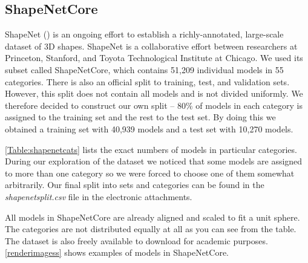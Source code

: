 


\subsection{ShapeNetCore}
\label{sec:shapenetcore}
ShapeNet (\cite{chang_shapenet:_2015}) is an ongoing effort to establish a richly-annotated, large-scale dataset of 3D shapes. ShapeNet is a collaborative effort between researchers at Princeton, Stanford, and Toyota Technological Institute at Chicago. We used its subset called ShapeNetCore, which contains 51,209 individual models in 55 categories. There is also an official split to training, test, and validation sets. However, this split does not contain all models and is not divided uniformly. We therefore decided to construct our own split -- 80\% of models in each category is assigned to the training set and the rest to the test set. By doing this we obtained a training set with 40,939 models and a test set with 10,270 models. \par \autoref{Table:shapenetcats} lists the exact numbers of models in particular categories. During our exploration of the dataset we noticed that some models are assigned to more than one category so we were forced to choose one of them somewhat arbitrarily. Our final split into sets and categories can be found in the \textit{shapenetsplit.csv} file in the electronic attachments.\par



All models in ShapeNetCore are already aligned and scaled to fit a unit sphere. The categories are not distributed equally at all as you can see from the table. The dataset is also freely available to download for academic purposes. \autoref{renderimagess} shows examples of models in ShapeNetCore.




